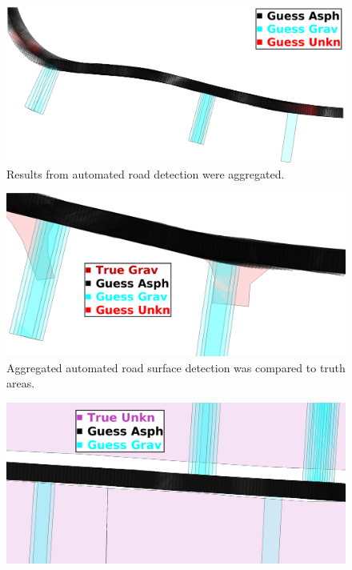 \documentclass[numbered,pdftex]{ohio-etd}
\begin{document}
{{		\begin{figure}[H]
			\centering
			\includegraphics[width=0.95\linewidth]{Defense_Images/agreggated_auto_guess}
			\caption[Aggregated Automated Road Surface Detection]{Results from automated road detection were aggregated.}
			\label{fig:agreggated_auto_guess}
		\end{figure}
		
		\begin{figure}[H]
			\centering
			\includegraphics[width=0.95\linewidth]{Defense_Images/guess_grav_intersect}
			\caption[Aggregated Automated Road Surface Detection]{Aggregated automated road surface detection was compared to truth areas. }
			\label{fig:guess_grav_intersect}
		\end{figure}
		
		\begin{figure}[H]
			\centering
			\includegraphics[width=0.95\linewidth]{Defense_Images/6range_guess_unkn_misclass}
			\caption[Automated Road Surface False Positive]{}
			\label{fig:6range_guess_unkn_misclass}
		\end{figure}
		
}}
\end{document}
